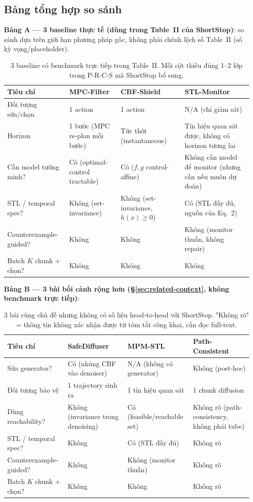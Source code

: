 \documentclass[a4paper,12pt]{article}
\begin{document}
\subsection{Bảng tổng hợp so sánh}
\textbf{Bảng A --- 3 baseline thực tế (dùng trong Table~II của ShortStop)}: so sánh dựa trên giới hạn phương pháp gốc, không phải chênh lệch số Table~II (số kỳ vọng/placeholder).
\begin{table}[H]
\centering\small
\begin{tabularx}{\textwidth}{@{}l X X X@{}}
\toprule
Tiêu chí & MPC-Filter~\cite{wabersich2021predictive} & CBF-Shield~\cite{ames2017cbf,cheng2019end} & STL-Monitor~\cite{deshmukh2017robust} \\
\midrule
Đối tượng sửa/chọn & 1 action & 1 action & N/A (chỉ giám sát) \\
Horizon & 1 bước (MPC re-plan mỗi bước) & Tức thời (instantaneous) & Tín hiệu quan sát được, không có horizon tương lai \\
Cần model tường minh? & Có (optimal-control tractable) & Có ($f,g$ control-affine) & Không cần model để monitor (nhưng cần nếu muốn dự đoán) \\
STL / temporal spec? & Không (set-invariance) & Không (set-invariance, $h(x)\ge0$) & Có (STL đầy đủ, nguồn của Eq.~2) \\
Counterexample-guided? & Không & Không & Không (monitor thuần, không repair) \\
Batch $K$ chunk + chọn? & Không & Không & Không \\
\bottomrule
\end{tabularx}
\caption{3 baseline có benchmark trực tiếp trong Table~II. Mỗi cột thiếu đúng 1--2 lớp trong P-R-C-S mà ShortStop bổ sung.}
\end{table}

\textbf{Bảng B --- 3 bài bối cảnh rộng hơn (\S\ref{sec:related-context}, không benchmark trực tiếp)}:
\begin{table}[H]
\centering\small
\begin{tabularx}{\textwidth}{@{}l X X X@{}}
\toprule
Tiêu chí & SafeDiffuser~\cite{xiao2023safediffuser} & MPM-STL~\cite{yu2024modelpredictive} & Path-Consistent~\cite{pathconsistent2025} \\
\midrule
Sửa generator? & Có (nhúng CBF vào denoiser) & N/A (không có generator) & Không (post-hoc) \\
Đối tượng bảo vệ & 1 trajectory sinh ra & 1 tín hiệu quan sát & 1 chunk diffusion \\
Dùng reachability? & Không (invariance trong denoising) & Có (feasible/reachable set) & Không rõ (path-consistency, không phải tube) \\
STL / temporal spec? & Không & Có (STL đầy đủ) & Không rõ \\
Counterexample-guided? & Không & Không (monitor thuần) & Không rõ \\
Batch $K$ chunk + chọn? & Không & Không & Không rõ \\
\bottomrule
\end{tabularx}
\caption{3 bài cùng chủ đề nhưng không có số liệu head-to-head với ShortStop. "Không rõ" = thông tin không xác nhận được từ tóm tắt công khai, cần đọc full-text.}
\end{table}
\end{document}
